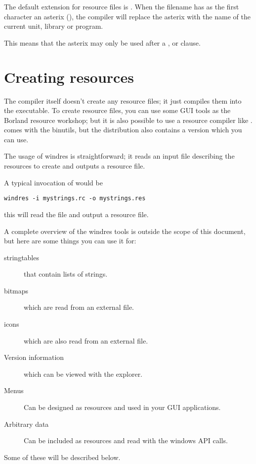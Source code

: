 {The default extension for resource files is . When the
filename has as the first character an asterix (\var{*}), the
compiler will replace the asterix with the name of the current unit,
library or program.

\begin{remark}This means that the asterix may only be used after a ,
 or  clause.
\end{remark}

\section{Creating resources}

The \fpc compiler itself doesn't create any resource files; it just
compiles them into the executable. To create resource files, you
can use some GUI tools as the Borland resource workshop; but it is
also possible to use a \windows resource compiler like \gnu
{}.  comes with the \gnu binutils, but the
\fpc distribution also contains a version which you can use.

The usage of windres is straightforward; it reads an input file
describing the resources to create and outputs a resource file.

A typical invocation of  would be
\begin{verbatim}
windres -i mystrings.rc -o mystrings.res
\end{verbatim}
this will read the  file and output a
 resource file.

A complete overview of the windres tools is outside the scope of this
document, but here are some things you can use it for:
\begin{description}
\item[stringtables] that contain lists of strings.
\item[bitmaps] which are read from an external file.
\item[icons] which are also read from an external file.
\item[Version information] which can be viewed with the \windows
explorer.
\item[Menus] Can be designed as resources and used in your GUI
applications.
\item[Arbitrary data] Can be included as resources and read with the
windows API calls.
\end{description}

Some of these will be described below.
}
